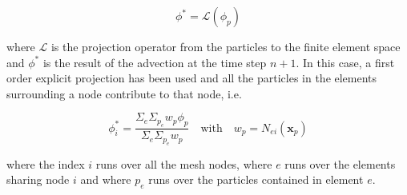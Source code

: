 \begin{equation}
    \phi^* = \mathcal L(\phi_p)
\end{equation}

where $\mathcal L$ is the projection operator from the particles to the finite element space and $\phi^*$ is the result of the advection at the time step $n+1$. In this case, a first order explicit projection has been used and all the particles in the elements surrounding a node contribute to that node, i.e.

\begin{equation}
    \phi_i^* = \dfrac
    {\Sigma_e\Sigma_{p_e} w_p \phi_p}
    {\Sigma_e\Sigma_{p_e} w_p}
    \quad \text{with} \quad
    w_p = N_{ei}(\mathbf x_p)
\end{equation}

where the index $i$ runs over all the mesh nodes, where $e$ runs over the elements sharing node $i$ and where $p_e$ runs over the particles contained in element $e$.


